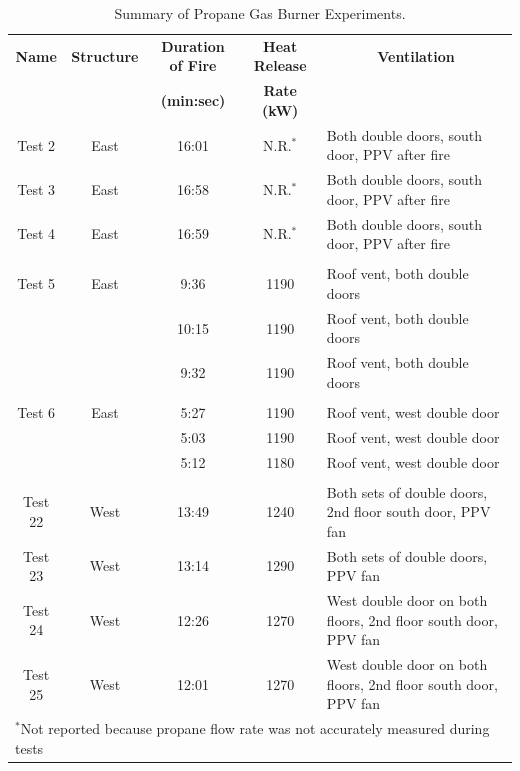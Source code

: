 \renewcommand{\baselinestretch}{1}
\begin{table}
\begin{center}
\caption{Summary of Propane Gas Burner Experiments.}
\begin{tabular}{ccccl}
\toprule
\textbf{Name}  	& 	\textbf{Structure} 	& 	\textbf{Duration of Fire} 	& 	\textbf{Heat Release} 		& 	\multicolumn{1}{c}{\textbf{Ventilation}}	\\ 
				& 						& 		\textbf{(min:sec)} 		& 	\textbf{Rate (kW)}			& 													\\
\midrule
Test 2 			& 	East 				&  		16:01 					& 	N.R.$^*$ 					& 	Both double doors, south door, PPV after fire	\\
Test 3			& 	East 				&  		16:58 					&   N.R.$^*$   					& 	Both double doors, south door, PPV after fire					\\
Test 4			& 	East 				&  		16:59 					&  	N.R.$^*$ 					& 	Both double doors, south door, PPV after fire					\\
\multicolumn{5}{c}{} \\
Test 5 			& 	East 				&  		 9:36 					&  		1190 					& 	Roof vent, both double doors				 					\\
				& 						& 		10:15 					&  		1190 					& 	Roof vent, both double doors				 					\\
				& 						& 		 9:32 					&  		1190 					& 	Roof vent, both double doors				 					\\				
\multicolumn{5}{c}{} \\
Test 6			&	East 				&  		 5:27 					&  		1190 					& 	Roof vent, west double door					 	    			\\
				& 						& 		 5:03 					&  		1190 					& 	Roof vent, west double door					 	    			\\
				& 						& 		 5:12 					&  		1180 					& 	Roof vent, west double door					 	    			\\
\multicolumn{5}{c}{} \\
Test 22			&	West 				&  		13:49 					&  		1240 					& 	Both sets of double doors, 2nd floor south door, PPV fan 		\\
Test 23			&	West 				&  		13:14 					&  		1290 					& 	Both sets of double doors, PPV fan						 		\\
Test 24			&	West 				&  		12:26 					&  		1270 					&   West double door on both floors, 2nd floor south door, PPV fan 	\\
Test 25			&	West 				&  		12:01 					&  		1270 					& 	West double door on both floors, 2nd floor south door, PPV fan 	\\
\bottomrule
\multicolumn{5}{l}{$^*$\footnotesize{Not reported because propane flow rate was not accurately measured during tests}}
\end{tabular}
\end{center}
\label{table:exp_summary}
\end{table}
\clearpage

